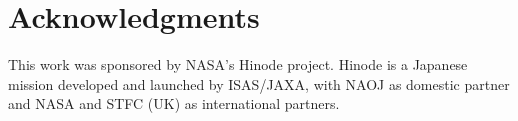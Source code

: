 
\chapter{Acknowledgments}

This work was sponsored by NASA's Hinode project. Hinode is a Japanese mission developed and
launched by ISAS/JAXA, with NAOJ as domestic partner and NASA and STFC (UK) as international
partners.
